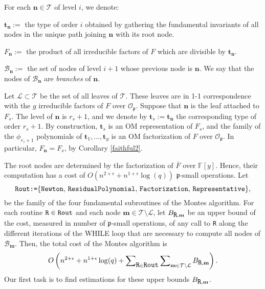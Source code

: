 \documentclass{amsart}
\begin{document}
For each ${\mathbf{n}}\in{\mathcal{T}}$ of level $i$, we denote:\medskip 

${\mathbf{t}}_{\mathbf{n}}:=$ the type of order $i$ obtained by gathering the fundamental invariants of all nodes in the unique path joining ${\mathbf{n}}$ with its root node.\medskip
   
$F_{\mathbf{n}}:=$ the product of all irreducible factors of $F$ which are divisible by ${\mathbf{t}}_{\mathbf{n}}$.\medskip

${{\mathcal B}}_{\mathbf{n}}:=$ the set of nodes of level $i+1$ whose previous node is ${\mathbf{n}}$. We say that the nodes of ${{\mathcal B}}_{\mathbf{n}}$ are \emph{branches} of ${\mathbf{n}}$.
\bigskip

Let ${\mathcal{L}}\subset{\mathcal{T}}$ be the set of all leaves of ${\mathcal{T}}$. These leaves are in 1-1 correspondence with the $g$ irreducible factors of $F$ over ${\mathcal{O}}_{\mathfrak{p}}$. Suppose that ${\mathbf{n}}$ is the leaf attached to $F_s$. The level of ${\mathbf{n}}$ is $r_s+1$, and we denote by ${\mathbf{t}}_s:={\mathbf{t}}_{\mathbf{n}}$ the corresponding type of order $r_s+1$. By construction, ${\mathbf{t}}_s$ is an OM representation of $F_s$, and the family of the $\phi_{r_s+1}$ polynomials of ${\mathbf{t}}_1,\dots,{\mathbf{t}}_g$ is an OM factorization of $F$ over ${\mathcal{O}}_{\mathfrak{p}}$. In particular, $F_{\mathbf{n}}=F_s$, by Corollary \ref{faithful2}.

The root nodes are determined by the factorization of $\overline{F}$ over ${\mathbb F}[y]$. Hence, their computation has a cost of $O(n^{2+\epsilon}+n^{1+\epsilon}\log(q))$ ${\mathfrak{p}}$-small operations.
Let 
$$
\mbox{\tt Rout:=}\{{\tt Newton},\, {\tt ResidualPolynomial},\, {\tt Factorization},\, {\tt Representative}\},
$$
be the family of the four fundamental subroutines of the Montes algorithm. For each routine $\mbox{\tt R}\in\mbox{\tt Rout}$ and each node ${\mathbf{m}}\in{\mathcal{T}}\setminus{\mathcal{L}}$, let $B_{\mbox{\tt R},{\mathbf{m}}}$ be an upper bound of the cost, measured in number of ${\mathfrak{p}}$-small operations, of any call to {\tt R} along the different iterations of the WHILE loop that are necessary to compute all nodes of ${{\mathcal B}}_{\mathbf{m}}$. Then, the total cost of the Montes algorithm is 
\begin{align}\label{wholecomplexity}
O\left(n^{2+\epsilon}+n^{1+\epsilon}\log(q)+\sum\nolimits_{\mbox{\tt R}\in\mbox{\tt Rout}}\sum\nolimits_{{\mathbf{m}} \in{\mathcal{T}}\setminus{\mathcal{L}}}B_{\mbox{\tt R},{\mathbf{m}}}\right).
\end{align}
Our first task is to find estimations for these upper bounds $B_{\mbox{\tt R},{\mathbf{m}}}$.
\end{document}
